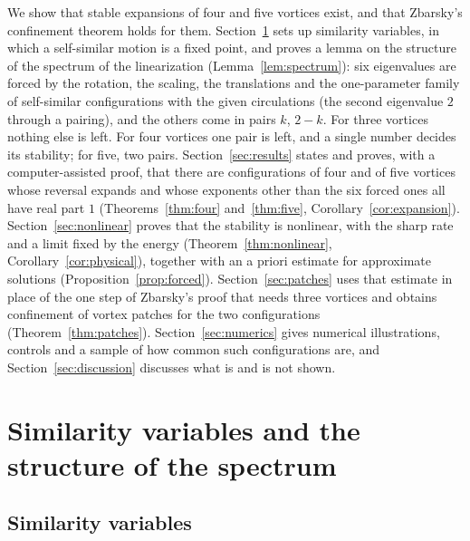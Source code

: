 \documentclass[11pt]{article}
\theoremstyle{definition}
\begin{document}
We show that stable expansions of four and five vortices exist, and that Zbarsky's confinement theorem holds for them. Section~\ref{sec:setting} sets up similarity variables, in which a self-similar motion is a fixed point, and proves a lemma on the structure of the spectrum of the linearization (Lemma~\ref{lem:spectrum}): six eigenvalues are forced by the rotation, the scaling, the translations and the one-parameter family of self-similar configurations with the given circulations (the second eigenvalue $2$ through a pairing), and the others come in pairs $k$, $2 - k$. For three vortices nothing else is left. For four vortices one pair is left, and a single number decides its stability; for five, two pairs. Section~\ref{sec:results} states and proves, with a computer-assisted proof, that there are configurations of four and of five vortices whose reversal expands and whose exponents other than the six forced ones all have real part $1$ (Theorems~\ref{thm:four} and~\ref{thm:five}, Corollary~\ref{cor:expansion}). Section~\ref{sec:nonlinear} proves that the stability is nonlinear, with the sharp rate and a limit fixed by the energy (Theorem~\ref{thm:nonlinear}, Corollary~\ref{cor:physical}), together with an a priori estimate for approximate solutions (Proposition~\ref{prop:forced}). Section~\ref{sec:patches} uses that estimate in place of the one step of Zbarsky's proof that needs three vortices and obtains confinement of vortex patches for the two configurations (Theorem~\ref{thm:patches}). Section~\ref{sec:numerics} gives numerical illustrations, controls and a sample of how common such configurations are, and Section~\ref{sec:discussion} discusses what is and is not shown.

\section{Similarity variables and the structure of the spectrum}\label{sec:setting}

\subsection{Similarity variables}
\end{document}
